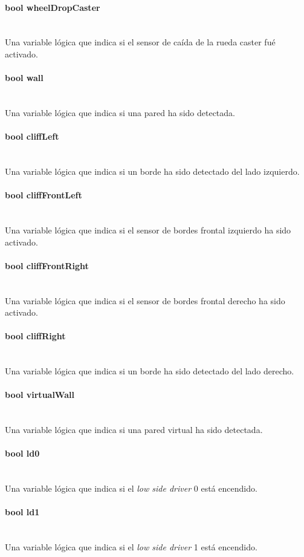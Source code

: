 \documentclass[letterpaper,openright,12pt]{book}
\begin{document}
\paragraph{bool wheelDropCaster}\mbox{}\\
Una variable lógica que indica si el sensor de caída de la rueda caster fué activado.
\paragraph{bool wall}\mbox{}\\
Una variable lógica que indica si una pared ha sido detectada.
\paragraph{bool cliffLeft}\mbox{}\\
Una variable lógica que indica si un borde ha sido detectado del lado izquierdo.
\paragraph{bool cliffFrontLeft}\mbox{}\\
Una variable lógica que indica si el sensor de bordes frontal izquierdo ha sido activado.
\paragraph{bool cliffFrontRight}\mbox{}\\
Una variable lógica que indica si el sensor de bordes frontal derecho ha sido activado.
\paragraph{bool cliffRight}\mbox{}\\
Una variable lógica que indica si un borde ha sido detectado del lado derecho.
\paragraph{bool virtualWall}\mbox{}\\
Una variable lógica que indica si una pared virtual ha sido detectada.
\paragraph{bool ld0}\mbox{}\\
Una variable lógica que indica si el \emph{low side driver } 0 está encendido.
\paragraph{bool ld1}\mbox{}\\
Una variable lógica que indica si el \emph{low side driver } 1 está encendido.
\end{document}
